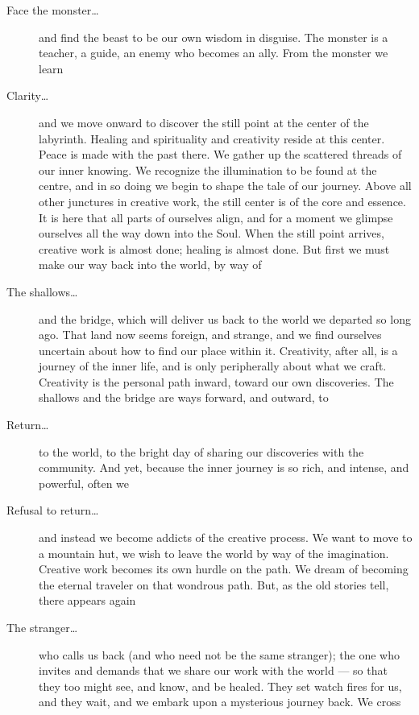 \documentclass[letterpaper,oneside]{memoir}
\begin{document}
\begin{description}
\begin{description}
\item[Face the monster\ldots] and find the beast to be our own wisdom in disguise. The monster is a teacher, a guide, an enemy who becomes an ally. From the monster we learn

\item[Clarity\ldots] and we move onward to discover the still point at the center of the labyrinth. Healing and spirituality and creativity reside at this center. Peace is made with the past there. We gather up the scattered threads of our inner knowing. We recognize the illumination to be found at the centre, and in so doing we begin to shape the tale of our journey. Above all other junctures in creative work, the still center is of the core and essence. It is here that all parts of ourselves align, and for a moment we glimpse ourselves all the way down into the Soul. When the still point arrives, creative work is almost done; healing is almost done. But first we must make our way back into the world, by way of

\item[The shallows\ldots] and the bridge, which will deliver us back to the world we departed so long ago. That land now seems foreign, and strange, and we find ourselves uncertain about how to find our place within it. Creativity, after all, is a journey of the inner life, and is only peripherally about what we craft. Creativity is the personal path inward, toward our own discoveries. The shallows and the bridge are ways forward, and outward, to

\item[Return\ldots] to the world, to the bright day of sharing our discoveries with the community. And yet, because the inner journey is so rich, and intense, and powerful, often we

\item[Refusal to return\ldots] and instead we become addicts of the creative process. We want to move to a mountain hut, we wish to leave the world by way of the imagination. Creative work becomes its own hurdle on the path. We dream of becoming the eternal traveler on that wondrous path. But, as the old stories tell, there appears again

\item[The stranger\ldots] who calls us back (and who need not be the same stranger); the one who invites and demands that we share our work with the world --- so that they too might see, and know, and be healed. They set watch fires for us, and they wait, and we embark upon a mysterious journey back. We cross


\end{description}
\end{description}
\end{document}
